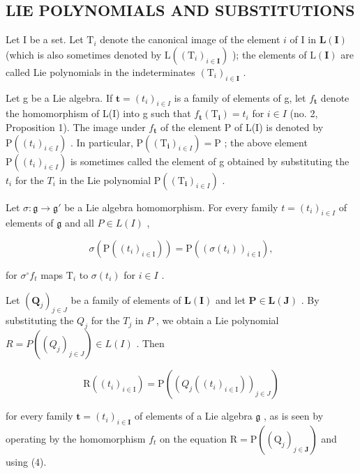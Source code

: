 \subsection{LIE POLYNOMIALS AND SUBSTITUTIONS}

Let I be a set. Let \(\mathrm{T}_i\) denote the canonical image of the element \(i\) of I in \(\mathbf{L}(\mathbf{I})\) (which is also sometimes denoted by \(\mathrm{L}((\mathrm{T}_i)_{i\in \mathbf{I}})\) ); the elements of \(\mathrm{L}(\mathbf{I})\) are called Lie polynomials in the indeterminates \((\mathrm{T}_i)_{i\in \mathbf{I}}\) .

Let g be a Lie algebra. If \(\boldsymbol{t} = (t_{i})_{i \in I}\) is a family of elements of g, let \(f_{\boldsymbol{t}}\) denote the homomorphism of L(I) into g such that \(f_{\boldsymbol{t}}(\mathrm{T}_{\boldsymbol{i}}) = t_{i}\) for \(i \in I\) (no. 2, Proposition 1). The image under \(f_{\boldsymbol{t}}\) of the element P of L(I) is denoted by \(\mathrm{P}((t_{i})_{i \in I})\) . In particular, \(\mathrm{P}((\mathrm{T}_{\boldsymbol{i}})_{i \in I}) = \mathrm{P}\) ; the above element \(\mathrm{P}((t_{i})_{i \in I})\) is sometimes called the element of g obtained by substituting the \(t_{i}\) for the \(T_{i}\) in the Lie polynomial \(\mathrm{P}((\mathrm{T}_{\boldsymbol{i}})_{i \in I})\) .

Let \(\sigma: \mathfrak{g} \to \mathfrak{g}'\) be a Lie algebra homomorphism. For every family \(t = (t_i)_{i \in I}\) of elements of \(\mathfrak{g}\) and all \(P \in L(I)\) ,

\[
\sigma (\mathrm{P} ((t _ {i}) _ {i \in \mathrm{I}})) = \mathrm{P} ((\sigma (t _ {i})) _ {i \in \mathrm{I}}),\tag{4}
\]

for \(\sigma^{\circ}f_{t}\) maps \(\mathrm{T}_i\) to \(\sigma(t_i)\) for \(i\in I\) .

Let \((\mathbf{Q}_j)_{j\in J}\) be a family of elements of \(\mathbf{L}(\mathbf{I})\) and let \(\mathbf{P}\in \mathbf{L}(\mathbf{J})\) . By substituting the \(Q_{j}\) for the \(T_{j}\) in \(P\) , we obtain a Lie polynomial \(R = P((Q_{j})_{j \in J}) \in L(I)\) . Then

\[
\mathrm{R} ((t _ {i}) _ {i \in \mathrm{I}}) = \mathrm{P} ((Q _ {j} ((t _ {i}) _ {i \in \mathrm{I}})) _ {j \in J})\tag{5}
\]

for every family \(\pmb{t} = (t_i)_{i\in \mathbf{I}}\) of elements of a Lie algebra \(\mathfrak{g}\) , as is seen by operating by the homomorphism \(f_{t}\) on the equation \(\mathrm{R} = \mathrm{P}((\mathrm{Q}_j)_{j\in \mathbf{J}})\) and using (4).

